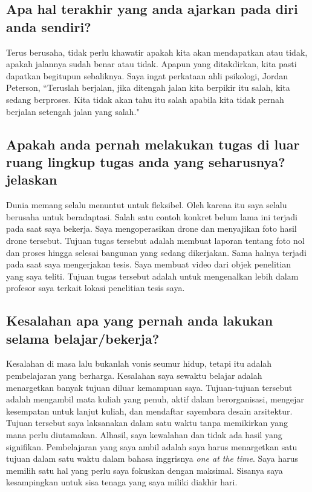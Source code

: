 \documentclass[../main.tex]{subfiles}
\begin{document}
\subsection{Apa hal terakhir yang anda ajarkan pada diri anda sendiri?}

Terus berusaha, tidak perlu khawatir apakah kita akan mendapatkan atau tidak, apakah jalannya sudah benar atau tidak. Apapun yang ditakdirkan, kita pasti dapatkan begitupun sebaliknya. Saya ingat perkataan ahli psikologi, Jordan Peterson, ``Teruslah berjalan, jika ditengah jalan kita berpikir itu salah, kita sedang berproses. Kita tidak akan tahu itu salah apabila kita tidak pernah berjalan setengah jalan yang salah."


\subsection{Apakah anda pernah melakukan tugas di luar ruang lingkup tugas anda yang seharusnya? jelaskan}
Dunia memang selalu menuntut untuk fleksibel. Oleh karena itu saya selalu berusaha untuk beradaptasi.
Salah satu contoh konkret belum lama ini terjadi pada saat saya bekerja.
Saya mengoperasikan drone dan menyajikan foto hasil drone tersebut.
Tujuan tugas tersebut adalah membuat laporan tentang foto nol dan proses hingga selesai bangunan yang sedang dikerjakan.
Sama halnya terjadi pada saat saya mengerjakan tesis.
Saya membuat video dari objek penelitian yang saya teliti.
Tujuan tugas tersebut adalah untuk mengenalkan lebih dalam profesor saya terkait lokasi penelitian tesis saya.


\subsection{Kesalahan apa yang pernah anda lakukan selama belajar/bekerja?}
Kesalahan di masa lalu bukanlah vonis seumur hidup, tetapi itu adalah pembelajaran yang berharga.
Kesalahan saya sewaktu belajar adalah menargetkan banyak tujuan diluar kemampuan saya.
Tujuan-tujuan tersebut adalah mengambil mata kuliah yang penuh, aktif dalam berorganisasi, mengejar kesempatan untuk lanjut kuliah, dan mendaftar sayembara desain arsitektur.
Tujuan tersebut saya laksanakan dalam satu waktu tanpa memikirkan yang mana perlu diutamakan. Alhasil, saya kewalahan dan tidak ada hasil yang signifikan. Pembelajaran yang saya ambil adalah saya harus menargetkan satu tujuan dalam satu waktu dalam bahasa inggrisnya \textit{one at the time}. Saya harus memilih satu hal yang perlu saya fokuskan dengan maksimal. Sisanya saya kesampingkan untuk sisa tenaga yang saya miliki diakhir hari.
\end{document}
